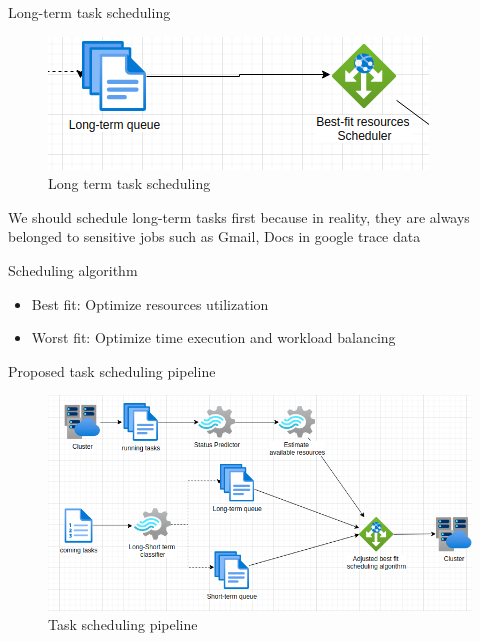 \documentclass[10pt,xcolor={dvipsnames}, aspectratio=169]{beamer}
\begin{document}
\begin{frame}
{Long-term task scheduling} 
	\begin{figure}
		\centering
		\includegraphics[scale=0.5]{images/long_term_queue.png}
		\caption{Long term task scheduling}
	\end{figure}
	\begin{block}
	{We should schedule long-term tasks first because in reality, they are always belonged to sensitive jobs such as Gmail, Docs in google trace data}
	\end{block}
	\begin{block}
	{Scheduling algorithm}
		\begin{itemize}
			\item Best fit: Optimize resources utilization
			\item Worst fit: Optimize time execution and workload balancing 
		\end{itemize}
	\end{block}
\end{frame}

\begin{frame}
{Proposed task scheduling pipeline}
	\begin{figure}
		\centering
		\includegraphics[scale=0.5]{images/scheduling_pipeline.png}
		\caption{Task scheduling pipeline}
	\end{figure}
\end{frame}
\end{document}
